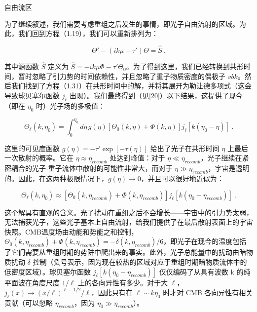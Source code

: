 自由流区

为了继续叙述，我们需要考虑重组之后发生的事情，即光子自由流射的区域。为此，我们回到方程（1.19），我们可以重新排列为：

\[ \Theta' - (ik\mu - \tau')\Theta = \hat{S} ~. \]

其中源函数 \( \hat{S} \) 定义为 \( \hat{S} = -ik\mu\Phi - \tau'\Theta_0 \)。为了得到这里，我们已经转换到共形时间，暂时忽略了引力势的时间依赖性，并且忽略了重子物质密度的偶极子 \( vbk \)。然后我们找到了方程（1.31）在共形时间中的解，并将其展开为勒让德多项式（这会导致球贝塞尔函数 \( j_\ell \) 出现）。我们最终得到（见[20]）以下结果，这提供了现今（即在 \( \eta_0 \) 时）光子场的多极值：

\[ \Theta_\ell(k, \eta_0) = \int_0^{\eta_0} d\eta \, g(\eta) \left[ \Theta_0(k, \eta) + \Phi(k, \eta) \right] j_\ell[k(\eta_0 - \eta)] ~. \]

这里的可见度函数 \( g(\eta) = -\tau' \exp[-\tau(\eta)] \) 给出了光子在共形时间 \( \eta \) 上最后一次散射的概率。它在 \( \eta \approx \eta_{recomb} \) 处达到峰值：对于 \( \eta \ll \eta_{recomb} \)，光子继续在紧密耦合的光子-重子流体中散射的可能性非常大，而对于 \( \eta \gg \eta_{recomb} \)，宇宙是透明的。因此，在这两种极限情况下，\( g(\eta) \to 0 \)，并且可以很好地近似为：

\[ \Theta_\ell(k, \eta_0) \approx \left[ \Theta_0(k, \eta_{recomb}) + \Phi(k, \eta_{recomb}) \right] j_\ell[k(\eta_0 - \eta_{recomb})] ~. \]

这个解具有直观的含义。光子扰动在重组之后不会增长——宇宙中的引力势太弱，无法捕获光子，这些光子基本上自由流射，给我们提供了在最后散射表面上的宇宙快照。CMB温度场由动能和势能之和控制，\( \Theta_0(k, \eta_{recomb}) + \Phi(k, \eta_{recomb}) = -\delta(k, \eta_{recomb})/6 \)，即光子在现今的温度包括了它们需要从重组时期的势阱中爬出来的事实。此外，光子总能量中的扰动由暗物质扰动 \( \delta \) 控制（负号表示，因为现在较热的区域对应于重组时期暗物质流体中的低密度区域）。球贝塞尔函数 \( j_\ell[k(\eta_0 - \eta_{recomb})] \) 仅仅编码了从具有波数 k 的纯平面波在角度尺度 \( 1/\ell \) 上的各向异性有多少。对于大 \( \ell \)，\( j_\ell(x) \to (x/\ell)^{\ell-1/2}/\ell \)，因此只有在 \( \ell \sim k\eta_0 \) 时才对 CMB 各向异性有相关贡献（可以忽略 \( \eta_{recomb} \)，因为 \( \eta_0 \gg \eta_{recomb} \)）。




